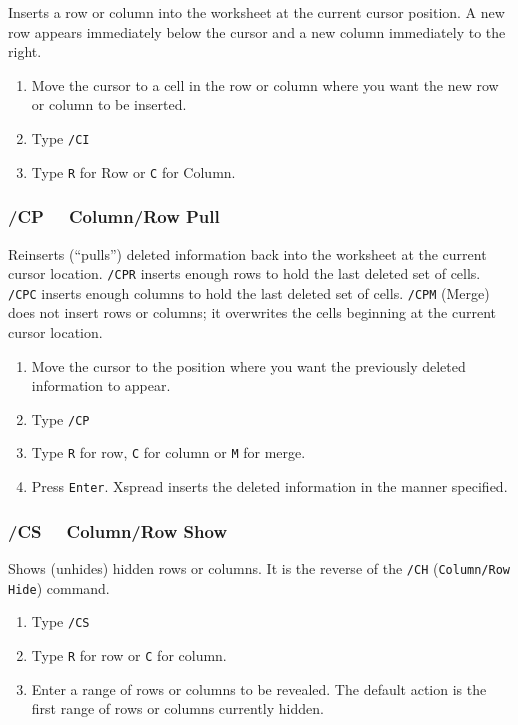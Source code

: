 \documentclass[titlepage]{article}
\begin{document}
Inserts a row or column into the worksheet at the current cursor
position.  A new row appears immediately below the cursor and a new
column immediately to the right.

\usage{}
\begin{enumerate}\itemsep -2pt
\item Move the cursor to a cell in the row or column where you want
  the new row or column to be inserted.
\item Type \texttt{/CI}
\item Type \texttt{R} for Row or \texttt{C} for Column.
\end{enumerate}


\subsubsection{/CP \ \     Column/Row Pull}

Reinserts (``pulls'') deleted information back into the worksheet at
the current cursor location.  \texttt{/CPR} inserts enough rows to
hold the last deleted set of cells.  \texttt{/CPC} inserts enough
columns to hold the last deleted set of cells.  \texttt{/CPM} (Merge)
does not insert rows or columns; it overwrites the cells beginning at
the current cursor location.

\usage{}
\begin{enumerate}\itemsep -2pt
\item Move the cursor to the position where you want the previously deleted
  information to appear.
\item Type \texttt{/CP}
\item Type \texttt{R} for row, \texttt{C} for column or \texttt{M} for
  merge.
\item Press \texttt{Enter}.  \textsf{Xspread} inserts the deleted
  information in the manner specified.
\end{enumerate}

\subsubsection{/CS \ \     Column/Row Show}

Shows (unhides) hidden rows or columns.  It is the reverse of the
\texttt{/CH} (\texttt{Column/Row Hide}) command.

\usage{}
\begin{enumerate}\itemsep -2pt
\item Type \texttt{/CS}
\item Type \texttt{R} for row or \texttt{C} for column.
\item Enter a range of rows or columns to be revealed.  The default
  action is the first range of rows or columns currently hidden.
\end{enumerate}
\end{document}
